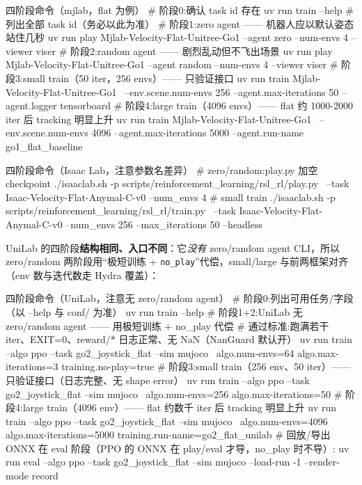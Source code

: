 \begin{codebox}[bash]{四阶段命令（mjlab，flat 为例）}
# 阶段0:确认 task id 存在
uv run train --help          # 列出全部 task id（务必以此为准）
# 阶段1:zero agent —— 机器人应以默认姿态站住几秒
uv run play Mjlab-Velocity-Flat-Unitree-Go1 --agent zero --num-envs 4 --viewer viser
# 阶段2:random agent —— 剧烈乱动但不飞出场景
uv run play Mjlab-Velocity-Flat-Unitree-Go1 --agent random --num-envs 4 --viewer viser
# 阶段3:small train（50 iter，256 envs）—— 只验证接口
uv run train Mjlab-Velocity-Flat-Unitree-Go1 \
  --env.scene.num-envs 256 --agent.max-iterations 50 --agent.logger tensorboard
# 阶段4:large train（4096 envs）—— flat 约 1000-2000 iter 后 tracking 明显上升
uv run train Mjlab-Velocity-Flat-Unitree-Go1 \
  --env.scene.num-envs 4096 --agent.max-iterations 5000 --agent.run-name go1_flat_baseline
\end{codebox}

\begin{codebox}[bash]{四阶段命令（Isaac Lab，注意参数名差异）}
# zero/random:play.py 加空 checkpoint
./isaaclab.sh -p scripts/reinforcement_learning/rsl_rl/play.py \
  --task Isaac-Velocity-Flat-Anymal-C-v0 --num_envs 4
# small train
./isaaclab.sh -p scripts/reinforcement_learning/rsl_rl/train.py \
  --task Isaac-Velocity-Flat-Anymal-C-v0 --num_envs 256 --max_iterations 50 --headless
\end{codebox}

UniLab 的四阶段\textbf{结构相同、入口不同}：它\emph{没有} zero/random agent CLI，所以 zero/random 两阶段用“极短训练 + \verb|no_play|”代偿，small/large 与前两框架对齐（env 数与迭代数走 Hydra 覆盖）：

\begin{codebox}[bash]{四阶段命令（UniLab，注意无 zero/random agent）}
# 阶段0:列出可用任务/字段（以 --help 与 conf/ 为准）
uv run train --help
# 阶段1+2:UniLab 无 zero/random agent —— 用极短训练 + no_play 代偿
#   通过标准:跑满若干 iter、EXIT=0、reward/* 日志正常、无 NaN（NanGuard 默认开）
uv run train --algo ppo --task go2_joystick_flat --sim mujoco \
  algo.num-envs=64 algo.max-iterations=3 training.no-play=true
# 阶段3:small train（256 env、50 iter）—— 只验证接口（日志完整、无 shape error）
uv run train --algo ppo --task go2_joystick_flat --sim mujoco \
  algo.num-envs=256 algo.max-iterations=50
# 阶段4:large train（4096 env）—— flat 约数千 iter 后 tracking 明显上升
uv run train --algo ppo --task go2_joystick_flat --sim mujoco \
  algo.num-envs=4096 algo.max-iterations=5000 training.run-name=go2_flat_unilab
# 回放/导出 ONNX 在 eval 阶段（PPO 的 ONNX 在 play/eval 才导，no_play 时不导）:
uv run eval --algo ppo --task go2_joystick_flat --sim mujoco --load-run -1 --render-mode record
\end{codebox}

